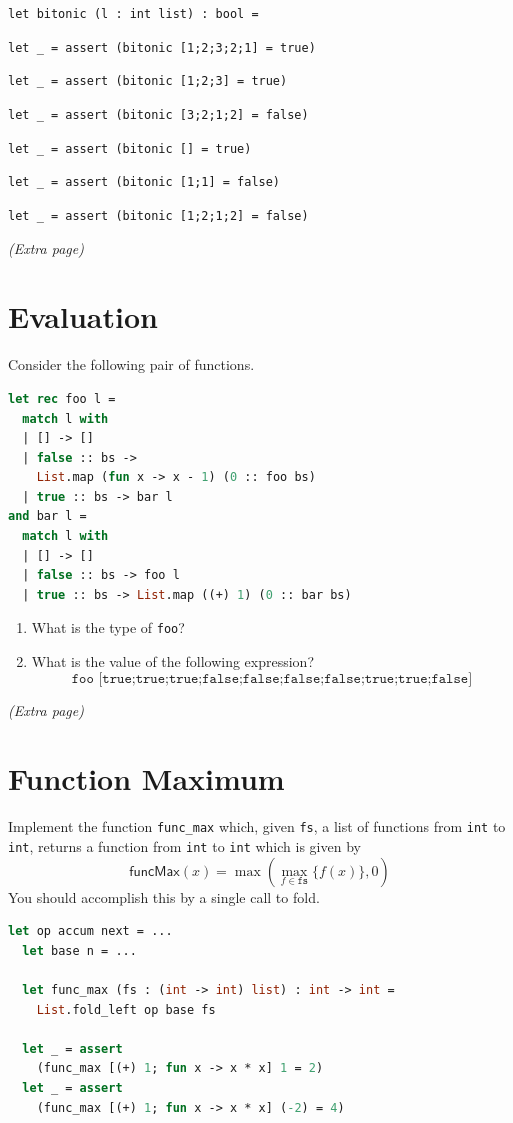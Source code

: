 \documentclass{article}
\theoremstyle{remark} \newtheorem*{solution}{Solution}
\begin{document}
\noindent
\texttt{let bitonic (l : int list) : bool =}
\vfill

\noindent
\texttt{let \_ = assert (bitonic [1;2;3;2;1] = true)}

\noindent
\texttt{let \_ = assert (bitonic [1;2;3] = true)}

\noindent
\texttt{let \_ = assert (bitonic [3;2;1;2] = false)}

\noindent
\texttt{let \_ = assert (bitonic [] = true)}

\noindent
\texttt{let \_ = assert (bitonic [1;1] = false)}

\noindent
\texttt{let \_ = assert (bitonic [1;2;1;2] = false)}

\pagebreak
\textit{(Extra page)}

\pagebreak
\section{Evaluation}

Consider the following pair of functions.
\begin{lstlisting}[language=ocaml]
let rec foo l =
  match l with
  | [] -> []
  | false :: bs ->
    List.map (fun x -> x - 1) (0 :: foo bs)
  | true :: bs -> bar l
and bar l =
  match l with
  | [] -> []
  | false :: bs -> foo l
  | true :: bs -> List.map ((+) 1) (0 :: bar bs)
\end{lstlisting}
\begin{enumerate}
\item
  What is the type of \texttt{foo}?
  \vspace{1in}
\item What is the value of the following expression?
  \begin{displaymath}
    \texttt{foo [true;true;true;false;false;false;false;true;true;false]}
  \end{displaymath}
\end{enumerate}

\pagebreak
\textit{(Extra page)}

\pagebreak
\section{Function Maximum}

Implement the function \texttt{func\_max} which, given \texttt{fs}, a list of functions from \texttt{int} to \texttt{int}, returns a function from \texttt{int} to \texttt{int} which is given by
\begin{displaymath}
  \mathsf{funcMax}(x) = \max(\max_{f \in \texttt{fs}}\{f(x)\}, 0)
\end{displaymath}
You should accomplish this by a single call to fold.
\begin{lstlisting}[language=ocaml]
  let op accum next = ...
  let base n = ...

  let func_max (fs : (int -> int) list) : int -> int =
    List.fold_left op base fs

  let _ = assert
    (func_max [(+) 1; fun x -> x * x] 1 = 2)
  let _ = assert
    (func_max [(+) 1; fun x -> x * x] (-2) = 4)
\end{lstlisting}
\bigskip
\end{document}
